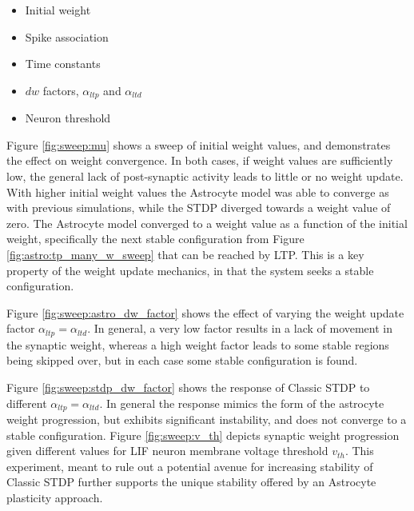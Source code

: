 \begin{itemize}
\item Initial weight
\item Spike association
\item Time constants
\item $dw$ factors, $\alpha_{ltp}$ and $\alpha_{ltd}$
\item Neuron threshold
\end{itemize}

Figure \ref{fig:sweep:mu} shows a sweep of initial weight values, and
demonstrates the effect on weight convergence. In both cases, if weight values
are sufficiently low, the general lack of post-synaptic activity leads to little
or no weight update. With higher initial weight values the Astrocyte model was
able to converge as with previous simulations, while the STDP diverged towards a
weight value of zero. The Astrocyte model converged to a weight value as a
function of the initial weight, specifically the next stable configuration from
Figure \ref{fig:astro:tp_many_w_sweep} that can be reached by LTP. This is a key
property of the weight update mechanics, in that the system seeks a stable
configuration.



Figure \ref{fig:sweep:astro_dw_factor} shows the effect of varying the weight
update factor $\alpha_{ltp}=\alpha_{ltd}$. In general, a very low factor results
in a lack of movement in the synaptic weight, whereas a high weight factor leads
to some stable regions being skipped over, but in each case some stable
configuration is found.



Figure \ref{fig:sweep:stdp_dw_factor} shows the response of Classic STDP to
different $\alpha_{ltp}=\alpha_{ltd}$. In general the response mimics the form
of the astrocyte weight progression, but exhibits significant instability, and
does not converge to a stable configuration. Figure \ref{fig:sweep:v_th} depicts
synaptic weight progression given different values for LIF neuron membrane
voltage threshold $v_{th}$. This experiment, meant to rule out a potential
avenue for increasing stability of Classic STDP further supports the unique
stability offered by an Astrocyte plasticity approach.

